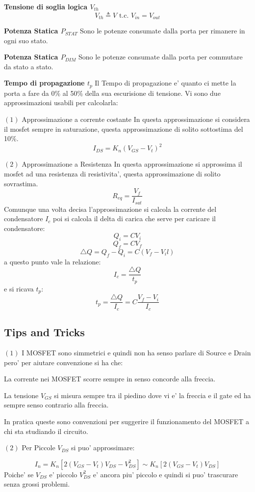 \documentclass[\main/main.tex]{subfiles}
\begin{document}
\textbf{Tensione di soglia logica $V_{th}$}
\[V_{th} \triangleq V \text{ t.c. } V_{in} = V_{out}\]

\textbf{Potenza Statica $P_{STAT}$}
Sono le potenze consumate dalla porta per rimanere in ogni suo stato.

\textbf{Potenza Statica $P_{DIM}$}
Sono le potenze consumate dalla porta per commutare da stato a stato.

\textbf{Tempo di propagazione $t_p$}
Il Tempo di propagazione e' quanto ci mette la porta a fare da 0\% al 50\% della sua escurisione di tensione.
Vi sono due approssimazioni usabili per calcolarla:

$(1)$ Approssimazione a corrente costante
In questa approssimazione si considera il mosfet sempre in saturazione, questa approssimazione di solito sottostima del 10\%.
\[ I_{DS} = K_n \left( V_{GS} - V_t \right)^2\]

$(2)$ Approssimazione a Resistenza
In questa approssimazione si approssima il mosfet ad una resistenza di resistivita', questa approssimazione di solito sovrastima.
\[R_{eq} = \frac{V_f}{I_{sat}} \]
Comunque una volta decisa l'approssimazione si calcola la corrente del condensatore $I_c$ poi si calcola il delta di carica che serve per caricare il condensatore:
\[Q_i = C V_i\]
\[Q_f = C V_f\]
\[\bigtriangleup Q = Q_f - Q_i = C \left( V_f - V_il\right) \]
a questo punto vale la relazione:
\[I_c = \frac{\bigtriangleup Q}{t_p}\]
e si ricava $t_p$:
\[t_p = \frac{\bigtriangleup Q}{I_c} = C \frac{V_f - V_i}{I_c}\]



\subsection{Tips and Tricks}
$(1)$ I MOSFET sono simmetrici e quindi non ha senso parlare di Source e Drain pero' per aiutare convenzione si ha che:

La corrente nei MOSFET scorre sempre in senso concorde alla freccia.

La tensione $V_{GS}$ si misura sempre tra il piedino dove vi e' la freccia e il gate ed ha sempre senso contrario alla freccia.

In pratica queste sono convenzioni per suggerire il funzionamento del MOSFET a chi sta studiando il circuito.

$(2)$ Per Piccole $V_{DS}$ si puo' approssimare:

\[I_n = K_n \left[ 2 \left( V_{GS} -V_t \right)V_{DS} - V_{DS}^2 \right] \sim K_n \left[ 2 \left( V_{GS} -V_t \right)V_{DS} \right]\]
Poiche' se $V_{DS}$ e' piccolo $V_{DS}^2$ e' ancora piu' piccolo e quindi si puo' trascurare senza grossi problemi.
\end{document}
